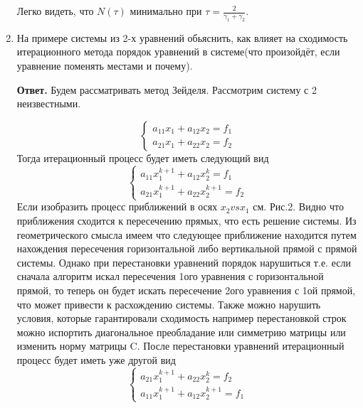 \documentclass{article}
\begin{document}
\begin{enumerate}
	Легко видеть, что $N(\tau)$ минимально при $\tau = \frac{2}{\gamma_1+\gamma_2}$.

        \item На примере системы из 2-х уравнений обьяснить, как влияет на сходимость итерационного метода 
        порядок уравнений в системе(что произойдёт, если уравнение поменять местами и почему).
        
        {\bfseries Ответ. }
        Будем рассматривать метод Зейделя. Рассмотрим систему с 2 неизвестными.
	
        \begin{equation}
            \begin{cases}
                a_{11}x_1+a_{12}x_2=f_1 \\
                a_{21}x_1+a_{22}x_2=f_2
            \end{cases}
        \end{equation}
        Тогда итерационный процесс будет иметь следующий вид 
        \begin{equation*}
            \begin{cases}
                a_{11}x_1^{k+1}+a_{12}x_2^{k}=f_1 \\
                a_{21}x_1^{k+1}+a_{22}x_2^{k+1}=f_2
            \end{cases}
        \end{equation*}
        Если изобразить процесс приближений в осях $x_2 vs x_1$  см. Рис.2. Видно что приближения сходится к пересечению прямых, что есть решение системы. Из геометрического смысла имеем что следующее приближение находится путем нахождения пересечения горизонтальной либо вертикальной прямой с прямой системы. Однако при перестановки уравнений порядок нарушиться т.е. если сначала алгоритм искал пересечения 1ого уравнения с горизонтальной прямой, то теперь он будет искать пересечение 2ого уравнения с 1ой прямой, что может привести к расхождению системы. Также можно нарушить условия, которые гарантировали сходимость например перестановкой строк можно испортить диагональное преобладание или симметрию матрицы или изменить норму матрицы C. После перестановки уравнений итерационный процесс будет иметь уже другой вид 
        \begin{equation*}
            \begin{cases}
                a_{21}x_1^{k+1}+a_{22}x_2^{k}=f_2 \\
                a_{11}x_1^{k+1}+a_{12}x_2^{k+1}=f_1
            \end{cases}
        \end{equation*}


\end{enumerate}
\end{document}
